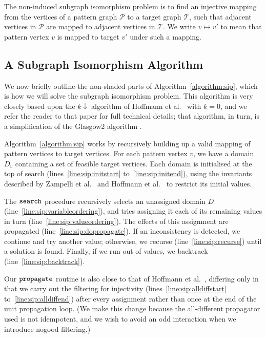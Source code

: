 \documentclass[a4paper,UKenglish]{lipics-v2018}
\newcommand{\siplineref}[1]{line~\ref{line:sip:#1}}
\newcommand{\siplinerangeref}[2]{lines~\ref{line:sip:#1} to~\ref{line:sip:#2}}
\newcommand{\algorithmref}[1]{Algorithm~\ref{#1}}
\newcommand{\Algorithmref}[1]{Algorithm~\ref{#1}}
\begin{document}
The non-induced subgraph isomorphism problem is to find an injective mapping from the vertices of a
pattern graph $\mathcal{P}$ to a target graph $\mathcal{T}$, such that adjacent vertices in
$\mathcal{P}$ are mapped to adjacent vertices in $\mathcal{T}$. We write $v \mapsto v'$ to mean that
pattern vertex $v$ is mapped to target $v'$ under such a mapping.

\subsection{A Subgraph Isomorphism Algorithm}

We now briefly outline the non-shaded parts of \algorithmref{algorithm:sip}, which is how we will solve the
subgraph isomorphism problem. This algorithm is very closely based upon the $k{\downarrow}$
algorithm of Hoffmann et al.\ \cite{DBLP:conf/aaai/HoffmannMR17} with $k = 0$, and we refer the reader to that paper
for full technical details; that algorithm, in turn, is a simplification of the Glasgow2 algorithm
\cite{DBLP:conf/cp/McCreeshP15,DBLP:conf/lion/KotthoffMS16}.

\Algorithmref{algorithm:sip} works by recursively building up a valid mapping of pattern vertices to target
vertices. For each pattern vertex $v$, we have a domain $D_v$ containing a set of feasible target
vertices. Each domain is initialised at the top of search (\siplinerangeref{initstart}{initend}),
using the invariants described by Zampelli et al.\ \cite{DBLP:journals/constraints/ZampelliDS10} and
Hoffmann et al.\ \cite{DBLP:conf/aaai/HoffmannMR17} to restrict its initial values.

The $\FuncSty{search}$ procedure recursively selects an unassigned domain $D$
(\siplineref{variableordering}), and tries assigning
it each of its remaining values in turn (\siplineref{valueordering}). The effects of this assignment
are propagated (\siplineref{dopropagate}). If an
inconsistency is detected, we continue and try another value; otherwise, we recurse
(\siplineref{recurse}) until a solution is found. Finally, if we run out of values, we backtrack
(\siplineref{backtrack}).

Our $\FuncSty{propagate}$ routine is also close to that of Hoffmann et al.\ \cite{DBLP:conf/aaai/HoffmannMR17},
differing only in that we carry out the filtering for injectivity
(\siplinerangeref{alldiffstart}{alldiffend}) after every assignment rather than once at the end of
the unit propagation loop. (We make this change because the all-different propagator used is not
idempotent, and we wish to avoid an odd interaction when we introduce nogood filtering.)
\end{document}
